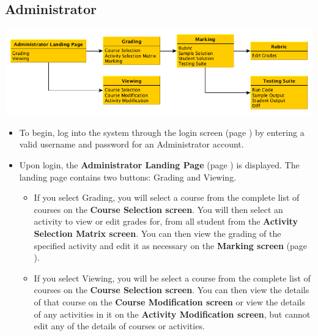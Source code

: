 \documentclass{article}
\begin{document}
\subsection{Administrator}
\centerline{\includegraphics[scale=0.6]{../images/UIMockups/pngs/admin}}
\begin{itemize}
  \item To begin, log into the system through the login screen (page \pageref{login})
    by entering a valid username and password for an Administrator account.
  \item Upon login, the \textbf{Administrator Landing Page} (page \pageref{landPg})
    is displayed. The landing page contains two buttons: Grading and Viewing.
    \begin{itemize}
    \item If you select Grading, you will select a course from the complete list of 
      courses on the \textbf{Course Selection screen}. You will then select an 
      activity to view or edit grades for, from all student from the \textbf{Activity 
	Selection Matrix screen}. You can then view the grading of the specified
      activity and edit it as necessary on the \textbf{Marking screen} (page
      \pageref{marking}).
    \item If you select Viewing, you will be select a course from the complete list of 
      courses on the \textbf{Course Selection screen}. You can then view the
      details of that course on the \textbf{Course Modification screen} or view the
      details of any activities in it on the \textbf{Activity Modification screen}, but
      cannot edit any of the details of courses or activities.
    \end{itemize}
\end{itemize}
\end{document}
